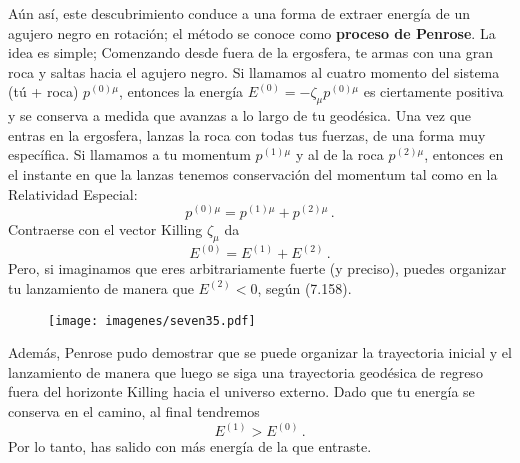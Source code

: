 \documentclass[11pt,b5paper,openany,twoside]{book}
\begin{document}
Aún así, este descubrimiento conduce a una forma de extraer energía de un agujero negro en rotación; el método se conoce como {\bf proceso de Penrose}.
La idea es simple; Comenzando desde fuera de la ergosfera, te armas con una gran roca y saltas hacia el agujero negro.
Si llamamos al cuatro momento del sistema (tú + roca) $p^{(0)\mu}$, entonces la energía $E^{(0)}=-\zeta_\mu p^{(0)\mu}$ es ciertamente positiva y se conserva a medida que avanzas a lo largo de tu geodésica.
Una vez que entras en la ergosfera, lanzas la roca con todas tus fuerzas, de una forma muy específica.
Si llamamos a tu momentum $p^{(1)\mu}$ y al de la roca $p^{(2)\mu}$, entonces en el instante en que la lanzas tenemos conservación del momentum tal como en la Relatividad Especial:
\begin{equation}
p^{(0)\mu}=p^{(1)\mu}+p^{(2)\mu}\,.\label{7.139}
\end{equation}
Contraerse con el vector Killing $\zeta_\mu$ da
\begin{equation}
E^{(0)}=E^{(1)}+E^{(2)}\,.\label{7.140}
\end{equation}
Pero, si imaginamos que eres arbitrariamente fuerte (y preciso), puedes organizar tu lanzamiento de manera que $E^{(2)}<0$, según (7.158).

\begin{figure}[h]
\centering
\texttt{[image: imagenes/seven35.pdf]}
\end{figure}
Además, Penrose pudo demostrar que se puede organizar la trayectoria inicial y el lanzamiento de manera que luego se siga una trayectoria geodésica de regreso fuera del horizonte Killing hacia el universo externo.
Dado que tu energía se conserva en el camino, al final tendremos
\begin{equation}
E^{(1)}>E^{(0)}\,.\label{7.141}
\end{equation}
Por lo tanto, has salido con más energía de la que entraste.
\end{document}
